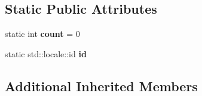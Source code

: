 \subsection*{Static Public Attributes}
\begin{DoxyCompactItemize}
\item 
\mbox{\label{structmy__facet_acf7681de6ede7213a8e5182c262f0a03}} 
static int {\bfseries count} = 0
\item 
\mbox{\label{structmy__facet_af5f0c378d2d3a8f41d5a0540c809e5e5}} 
static std\+::locale\+::id {\bfseries id}
\end{DoxyCompactItemize}
\subsection*{Additional Inherited Members}


